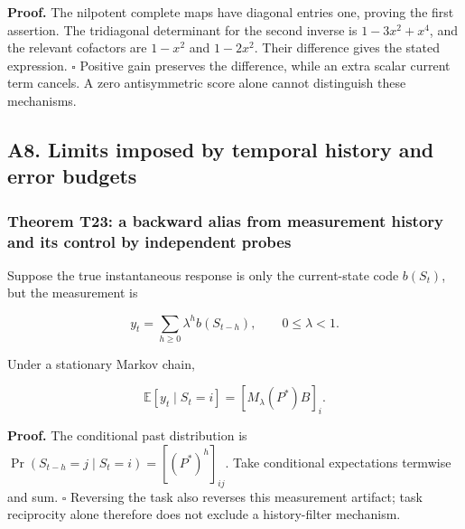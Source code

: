 \documentclass[11pt,a4paper]{article}
\begin{document}
\textbf{Proof.} The nilpotent complete maps have diagonal entries one,
proving the first assertion. The tridiagonal determinant for the second
inverse is \(1-3x^2+x^4\), and the relevant cofactors are \(1-x^2\) and
\(1-2x^2\). Their difference gives the stated expression. \(\square\)
Positive gain preserves the difference, while an extra scalar current
term cancels. A zero antisymmetric score alone cannot distinguish these
mechanisms.

\subsection{A8. Limits imposed by temporal history and error
budgets}\label{a8.-limits-imposed-by-temporal-history-and-error-budgets}

\subsubsection{Theorem T23: a backward alias from measurement history
and its control by independent
probes}\label{theorem-t23-a-backward-alias-from-measurement-history-and-its-control-by-independent-probes}

\par
\noindent\begin{minipage}{\linewidth}

Suppose the true instantaneous response is only the current-state code
\(b(S_t)\), but the measurement is

\[
y_t=\sum_{h\ge0}\lambda^h b(S_{t-h}),\qquad0\le\lambda<1.
\]

\end{minipage}\par

\par
\noindent\begin{minipage}{\linewidth}

Under a stationary Markov chain,

\[
\mathbb E[y_t\mid S_t=i]=[M_\lambda(P^*)B]_i.
\]

\end{minipage}\par

\textbf{Proof.} The conditional past distribution is
\(\Pr(S_{t-h}=j\mid S_t=i)=[(P^*)^h]_{ij}\). Take conditional
expectations termwise and sum. \(\square\) Reversing the task also
reverses this measurement artifact; task reciprocity alone therefore
does not exclude a history-filter mechanism.
\end{document}
